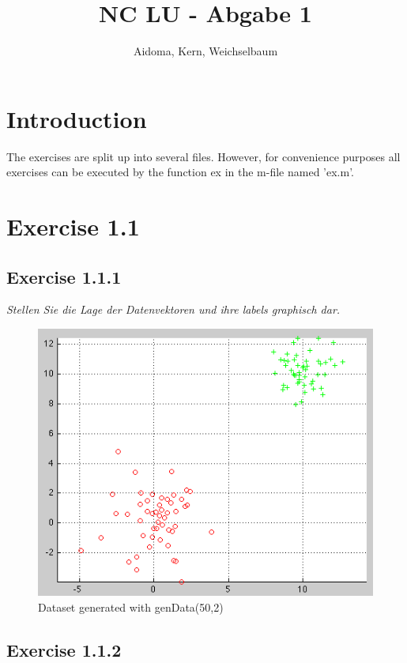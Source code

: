 \documentclass[12pt]{article}
\title{NC LU - Abgabe 1}
\author{Aidoma, Kern, Weichselbaum}
\begin{document}
	
\maketitle	
	

\section{Introduction}

The exercises are split up into several files. However, for convenience purposes all exercises can be executed by the function ex in the m-file named 'ex.m'.

\section{Exercise 1.1}
\subsection{Exercise 1.1.1}
\textit{Stellen Sie die Lage der Datenvektoren und ihre labels graphisch dar.}

\begin{figure}[htp]
	\centering
	\includegraphics[width=1\textwidth]{ab1_1_1.png}
	\caption{Dataset generated with genData(50,2)}
\end{figure}

\subsection{Exercise 1.1.2}
\end{document}
